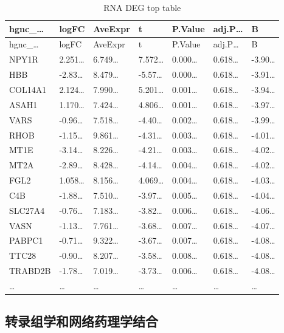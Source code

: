 \documentclass[
]{article}
\begin{document}
\begin{longtable}[]{@{}lllllll@{}}
\caption{\label{tab:RNA-DEG-top-table}RNA DEG top table}\tabularnewline
\toprule
hgnc\_\ldots{} & logFC & AveExpr & t & P.Value & adj.P\ldots{} & B\tabularnewline
\midrule
\endfirsthead
\toprule
hgnc\_\ldots{} & logFC & AveExpr & t & P.Value & adj.P\ldots{} & B\tabularnewline
\midrule
\endhead
NPY1R & 2.251\ldots{} & 6.749\ldots{} & 7.572\ldots{} & 0.000\ldots{} & 0.618\ldots{} & -3.90\ldots{}\tabularnewline
HBB & -2.83\ldots{} & 8.479\ldots{} & -5.57\ldots{} & 0.000\ldots{} & 0.618\ldots{} & -3.91\ldots{}\tabularnewline
COL14A1 & 2.124\ldots{} & 7.990\ldots{} & 5.201\ldots{} & 0.001\ldots{} & 0.618\ldots{} & -3.94\ldots{}\tabularnewline
ASAH1 & 1.170\ldots{} & 7.424\ldots{} & 4.806\ldots{} & 0.001\ldots{} & 0.618\ldots{} & -3.97\ldots{}\tabularnewline
VARS & -0.96\ldots{} & 7.518\ldots{} & -4.40\ldots{} & 0.002\ldots{} & 0.618\ldots{} & -3.99\ldots{}\tabularnewline
RHOB & -1.15\ldots{} & 9.861\ldots{} & -4.31\ldots{} & 0.003\ldots{} & 0.618\ldots{} & -4.01\ldots{}\tabularnewline
MT1E & -3.14\ldots{} & 8.226\ldots{} & -4.21\ldots{} & 0.003\ldots{} & 0.618\ldots{} & -4.02\ldots{}\tabularnewline
MT2A & -2.89\ldots{} & 8.428\ldots{} & -4.14\ldots{} & 0.004\ldots{} & 0.618\ldots{} & -4.02\ldots{}\tabularnewline
FGL2 & 1.058\ldots{} & 8.156\ldots{} & 4.069\ldots{} & 0.004\ldots{} & 0.618\ldots{} & -4.03\ldots{}\tabularnewline
C4B & -1.88\ldots{} & 7.510\ldots{} & -3.97\ldots{} & 0.005\ldots{} & 0.618\ldots{} & -4.04\ldots{}\tabularnewline
SLC27A4 & -0.76\ldots{} & 7.183\ldots{} & -3.82\ldots{} & 0.006\ldots{} & 0.618\ldots{} & -4.06\ldots{}\tabularnewline
VASN & -1.13\ldots{} & 7.761\ldots{} & -3.68\ldots{} & 0.007\ldots{} & 0.618\ldots{} & -4.07\ldots{}\tabularnewline
PABPC1 & -0.71\ldots{} & 9.322\ldots{} & -3.67\ldots{} & 0.007\ldots{} & 0.618\ldots{} & -4.08\ldots{}\tabularnewline
TTC28 & -0.90\ldots{} & 8.207\ldots{} & -3.58\ldots{} & 0.008\ldots{} & 0.618\ldots{} & -4.08\ldots{}\tabularnewline
TRABD2B & -1.78\ldots{} & 7.019\ldots{} & -3.73\ldots{} & 0.006\ldots{} & 0.618\ldots{} & -4.08\ldots{}\tabularnewline
\ldots{} & \ldots{} & \ldots{} & \ldots{} & \ldots{} & \ldots{} & \ldots{}\tabularnewline
\bottomrule
\end{longtable}

\hypertarget{ux8f6cux5f55ux7ec4ux5b66ux548cux7f51ux7edcux836fux7406ux5b66ux7ed3ux5408}{%
\subsection{转录组学和网络药理学结合}\label{ux8f6cux5f55ux7ec4ux5b66ux548cux7f51ux7edcux836fux7406ux5b66ux7ed3ux5408}}
\end{document}
